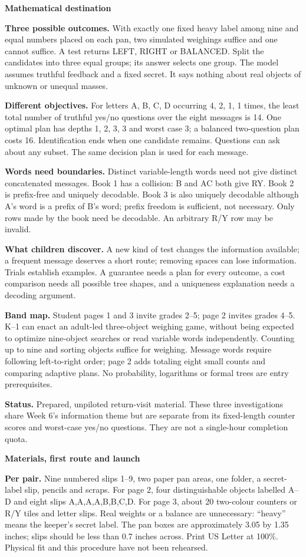 \documentclass[11pt]{article}
\newcommand{\parttitle}[1]{{\large\bfseries\color{ink}#1}\par}
\newcommand{\labelled}[2]{\textbf{#1} #2\par}
\begin{document}
\parttitle{Mathematical destination}
\labelled{Three possible outcomes.}{With exactly one fixed heavy label among nine and equal numbers placed on each pan, two simulated weighings suffice and one cannot suffice. A test returns LEFT, RIGHT or BALANCED. Split the candidates into three equal groups; its answer selects one group. The model assumes truthful feedback and a fixed secret. It says nothing about real objects of unknown or unequal masses.}
\labelled{Different objectives.}{For letters A, B, C, D occurring 4, 2, 1, 1 times, the least total number of truthful yes/no questions over the eight messages is 14. One optimal plan has depths 1, 2, 3, 3 and worst case 3; a balanced two-question plan costs 16. Identification ends when one candidate remains. Questions can ask about any subset. The same decision plan is used for each message.}
\labelled{Words need boundaries.}{Distinct variable-length words need not give distinct concatenated messages. Book 1 has a collision: B and AC both give RY. Book 2 is prefix-free and uniquely decodable. Book 3 is also uniquely decodable although A's word is a prefix of B's word; prefix freedom is sufficient, not necessary. Only rows made by the book need be decodable. An arbitrary R/Y row may be invalid.}
\labelled{What children discover.}{A new kind of test changes the information available; a frequent message deserves a short route; removing spaces can lose information. Trials establish examples. A guarantee needs a plan for every outcome, a cost comparison needs all possible tree shapes, and a uniqueness explanation needs a decoding argument.}
\labelled{Band map.}{Student pages 1 and 3 invite grades 2--5; page 2 invites grades 4--5. K--1 can enact an adult-led three-object weighing game, without being expected to optimize nine-object searches or read variable words independently. Counting up to nine and sorting objects suffice for weighing. Message words require following left-to-right order; page 2 adds totaling eight small counts and comparing adaptive plans. No probability, logarithms or formal trees are entry prerequisites.}
\labelled{Status.}{Prepared, unpiloted return-visit material. These three investigations share Week 6's information theme but are separate from its fixed-length counter scores and worst-case yes/no questions. They are not a single-hour completion quota.}
\newpage
\parttitle{Materials, first route and launch}
\labelled{Per pair.}{Nine numbered slips 1--9, two paper pan areas, one folder, a secret-label slip, pencils and scraps. For page 2, four distinguishable objects labelled A--D and eight slips A,A,A,A,B,B,C,D. For page 3, about 20 two-colour counters or R/Y tiles and letter slips. Real weights or a balance are unnecessary: ``heavy'' means the keeper's secret label. The pan boxes are approximately 3.05 by 1.35 inches; slips should be less than 0.7 inches across. Print US Letter at 100\%. Physical fit and this procedure have not been rehearsed.}
\end{document}
